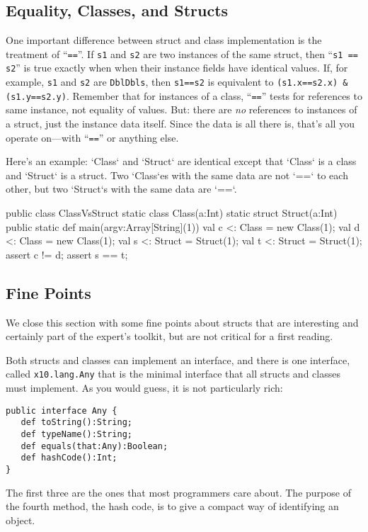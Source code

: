 \subsection{Equality, Classes, and Structs}

One important difference between struct and class
implementation is the treatment of ``{\tt ==}''.   If {\tt s1} and {\tt s2} are
two instances of the same struct, then ``{\tt s1 == s2}'' is true exactly when
when their instance fields have identical values.  If, for example, 
{\tt s1} and {\tt s2} are {\tt DblDbls}, then {\tt s1==s2}
is equivalent to {\tt (s1.x==s2.x) \& (s1.y==s2.y)}.  Remember that for
instances of a class, ``{\tt ==}'' tests for references to same instance,
not equality of values. But: there are {\em no} references to instances of a
struct, just the instance data itself.  Since the data is all there is, that's
all you operate on---with ``{\tt ==}'' or anything else.


Here's an example: \xcd`Class` and \xcd`Struct` are identical except that
\xcd`Class` is a class and \xcd`Struct` is a struct.  Two \xcd`Class`es with
the same data are not \xcd`==` to each other, but two \xcd`Struct`s with the
same data are \xcd`==`.
\begin{xtennum}[]
public class ClassVsStruct {
  static class  Class(a:Int)  {}
  static struct Struct(a:Int) {}
  public static def main(argv:Array[String](1)) {
    val c <: Class  = new Class(1);
    val d <: Class  = new Class(1);
    val s <: Struct = Struct(1);
    val t <: Struct = Struct(1);
    assert c != d;
    assert s == t;
  }
}
\end{xtennum}

\subsection{Fine Points}

We close this section with some fine points about structs that are interesting
and certainly part of the expert's toolkit, but are not critical for a first
reading.

\label{ssec:wasacs}
Both structs and classes can implement an interface, and there is one interface,
called {\tt x10.lang.Any} that is the minimal interface that all structs and
classes must implement.  As you would guess, it is not particularly rich:
\begin{verbatim}
public interface Any {
   def toString():String;
   def typeName():String;
   def equals(that:Any):Boolean;
   def hashCode():Int;
}
\end{verbatim}
The first three are the ones that most programmers care about.  The purpose of
the fourth method, the hash code, is to give a compact way of identifying an
object.

